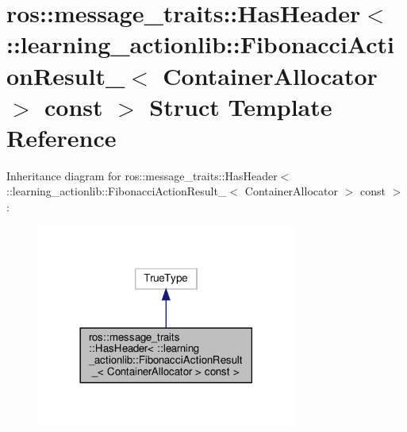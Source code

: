 \hypertarget{structros_1_1message__traits_1_1HasHeader_3_01_1_1learning__actionlib_1_1FibonacciActionResult__a577b5b770b716b196a128f139c41ea0}{}\section{ros\+:\+:message\+\_\+traits\+:\+:Has\+Header$<$ \+:\+:learning\+\_\+actionlib\+:\+:Fibonacci\+Action\+Result\+\_\+$<$ Container\+Allocator $>$ const $>$ Struct Template Reference}
\label{structros_1_1message__traits_1_1HasHeader_3_01_1_1learning__actionlib_1_1FibonacciActionResult__a577b5b770b716b196a128f139c41ea0}


Inheritance diagram for ros\+:\+:message\+\_\+traits\+:\+:Has\+Header$<$ \+:\+:learning\+\_\+actionlib\+:\+:Fibonacci\+Action\+Result\+\_\+$<$ Container\+Allocator $>$ const $>$\+:
\nopagebreak
\begin{figure}[H]
\begin{center}
\leavevmode
\includegraphics[width=242pt]{structros_1_1message__traits_1_1HasHeader_3_01_1_1learning__actionlib_1_1FibonacciActionResult__59a866d3f56cfe3e868cff886d41eabd}
\end{center}
\end{figure}


